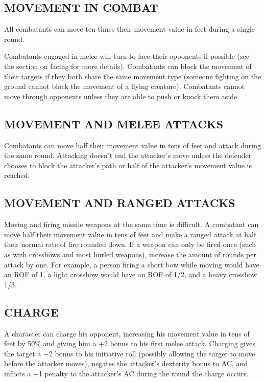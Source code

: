 \begin{multicols}{2}
\subsection{MOVEMENT IN COMBAT}

All combatants can move ten times their movement value in feet during a single round.

Combatants engaged in melee will turn to face their opponents if possible (see the section on facing for more details).  Combatants can block the movement of their targets if they both share the same movement type (someone fighting on the ground cannot block the movement of a flying creature).  Combatants cannot move through opponents unless they are able to push or knock them aside.

\subsection{MOVEMENT AND MELEE ATTACKS}

Combatants can move half their movement value in tens of feet and attack during the same round.  Attacking doesn't end the attacker's move unless the defender chooses to block the attacker's path or half of the attacker's movement value is reached.

\subsection{MOVEMENT AND RANGED ATTACKS}

Moving and firing missile weapons at the same time is difficult.  A combatant can move half their movement value in tens of feet and make a ranged attack at half their normal rate of fire rounded down.  If a weapon can only be fired once (such as with crossbows and most hurled weapons), increase the amount of rounds per attack by one.  For example, a person firing a short bow while moving would have an ROF of 1, a light crossbow would have an ROF of 1/2, and a heavy crossbow 1/3.

\subsection{CHARGE}

A character can charge his opponent, increasing his movement value in tens of feet by 50\% and giving him a +2 bonus to his first melee attack.  Charging gives the target a $-2$ bonus to his initiative roll (possibly allowing the target to move before the attacker moves), negates the attacker's dexterity bonus to AC, and inflicts a +1 penalty to the attacker's AC during the round the charge occurs.


\end{multicols}
